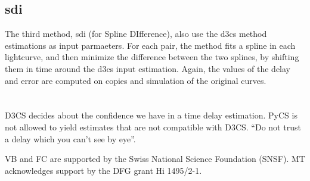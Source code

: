 \documentclass[traditabstract]{aa}
\begin{document}
\subsection{sdi}

The third method, sdi (for Spline DIfference), also use the d3cs method estimations as input parmaeters. For each pair, the method fits a spline in each lightcurve, and then minimize the difference between the two splines, by shifting them in time around the d3cs input estimation. Again, the values of the delay and error are computed on copies and simulation of the original curves.


\section{}

D3CS decides about the confidence we have in a time delay estimation. PyCS is not allowed to yield estimates that are not compatible with D3CS. “Do not trust a delay which you can't see by eye”.


\begin{acknowledgements}
VB and FC are supported by the Swiss National Science Foundation (SNSF). MT acknowledges support by the DFG grant Hi 1495/2-1.
\end{acknowledgements}





\end{document}

